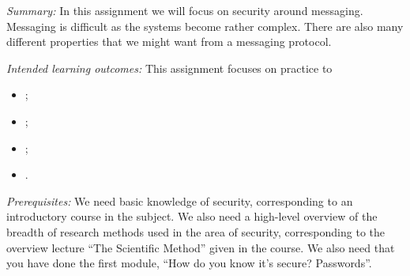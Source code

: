 
\emph{Summary:}
In this assignment we will focus on security around messaging.
Messaging is difficult as the systems become rather complex.
There are also many different properties that we might want from a messaging 
protocol.

\emph{Intended learning outcomes:}
This assignment focuses on practice to
\begin{itemize}
  \item \LOrelate;
  \item \LOevaluate;
  \item \LOapply;
  \item \LOcomm.
\end{itemize}

\emph{Prerequisites:}
We need basic knowledge of security, corresponding to an introductory course in 
the subject.
We also need a high-level overview of the breadth of research methods used in 
the area of security, corresponding to the overview lecture \enquote{The 
Scientific Method} given in the course.
We also need that you have done the first module, \enquote{How do you know it's 
secure? Passwords}.
